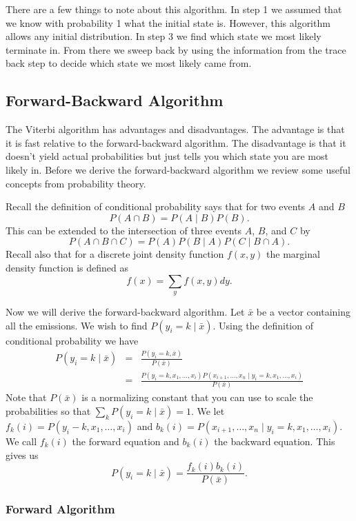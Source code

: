 \documentclass{article}
\numberwithin{equation}{section}
\renewcommand{\P}{P}
\begin{document}
There are a few things to note about this algorithm.  In step 1 we
assumed that we know with probability 1 what the initial state is.
However, this algorithm allows any initial distribution.  In step 3
we find which state we most likely terminate in.  From there we
sweep back by using the information from the trace back step to
decide which state we most likely came from.

\subsection{Forward-Backward Algorithm}

The Viterbi algorithm has advantages and disadvantages.  The
advantage is that it is fast relative to the forward-backward
algorithm.  The disadvantage is that it doesn't yield actual
probabilities but just tells you which state you are most likely in.
Before we derive the forward-backward algorithm we review some
useful concepts from probability theory.

Recall the definition of conditional probability says that for two
events $A$ and $B$
\[
\P(A\cap B)=\P(A\mid B)\P(B).
\]
This can be extended to the intersection of three events $A$, $B$,
and $C$ by
\[
\P(A\cap B\cap C)=\P(A)\P(B\mid A)\P(C\mid B\cap A).
\]
Recall also that for a discrete joint density function $f(x,y)$ the
marginal density function is defined as
\[
f(x)=\sum_y f(x,y)dy.
\]

Now we will derive the forward-backward algorithm.  Let $\bar{x}$ be
a vector containing all the emissions. We wish to find $\P(y_i=k\mid
\bar{x})$.  Using the definition of conditional probability we have
\begin{eqnarray*}
\P(y_i=k\mid \bar{x}) &=& \frac{\P(y_i=k,\bar{x})}{\P(\bar{x})} \\
&=& \frac{\P(y_i=k,x_1,\ldots,x_i)\P(x_{i+1},\ldots,x_n\mid
y_i=k,x_1,\ldots,x_i)}{\P(\bar{x})}
\end{eqnarray*}
Note that $\P(\bar{x})$ is a normalizing constant that you can use
to scale the probabilities so that $\sum_k\P(y_i=k\mid \bar{x})=1$.
We let $f_k(i)=\P(y_i-k,x_1,\ldots,x_i)$ and $b_k(i)=\P(x_{i+1},
\ldots,x_n\mid y_i=k,x_1,\ldots,x_i)$.  We call $f_k(i)$ the forward
equation and $b_k(i)$ the backward equation.  This gives us
\[
\P(y_i=k\mid \bar{x})=\frac{f_k(i)b_k(i)}{\P(\bar{x})}.
\]

\subsubsection{Forward Algorithm}
\end{document}
